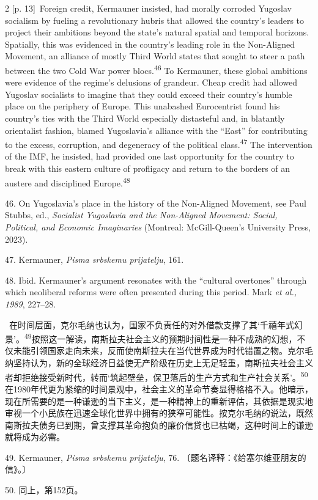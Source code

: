 \documentclass[10pt,a4paper]{article}
\begin{document}
\begin{paracol}{2}
{\scriptsize\color{gray} [p. 13]}\ Foreign credit, Kermauner insisted, had morally corroded Yugoslav socialism by fueling a revolutionary hubris that allowed the country’s leaders to project their ambitions beyond the state’s natural spatial and temporal horizons. Spatially, this was evidenced in the country’s leading role in the Non-Aligned Movement, an alliance of mostly Third World states that sought to steer a path between the two Cold War power blocs.\nobreak\textsuperscript{46} To Kermauner, these global ambitions were evidence of the regime’s delusions of grandeur. Cheap credit had allowed Yugoslav socialists to imagine that they could exceed their country’s humble place on the periphery of Europe. This unabashed Eurocentrist found his country’s ties with the Third World especially distasteful and, in blatantly orientalist fashion, blamed Yugoslavia’s alliance with the “East” for contributing to the excess, corruption, and degeneracy of the political class.\nobreak\textsuperscript{47} The intervention of the IMF, he insisted, had provided one last opportunity for the country to break with this eastern culture of profligacy and return to the borders of an austere and disciplined Europe.\nobreak\textsuperscript{48}\par{\small 46. On Yugoslavia’s place in the history of the Non-Aligned Movement, see Paul Stubbs, ed., \textit{Socialist Yugoslavia and the Non-Aligned Movement: Social, Political, and Economic Imaginaries} (Montreal: McGill-Queen’s University Press, 2023).\par}{\small 47. Kermauner, \textit{Pisma srbskemu prijatelju}, 161.\par}{\small 48. Ibid. Kermauner’s argument resonates with the “cultural overtones” through which neoliberal reforms were often presented during this period. Mark \textit{et al., 1989}, 227–28.\par}
\switchcolumn*
{\scriptsize\color{gray} [p. 13]}\ 在时间层面，克尔毛纳也认为，国家不负责任的对外借款支撑了其‘千禧年式幻景’。\nobreak\textsuperscript{49}按照这一解读，南斯拉夫社会主义的预期时间性是一种不成熟的幻想，不仅未能引领国家走向未来，反而使南斯拉夫在当代世界成为时代错置之物。克尔毛纳坚持认为，新的全球经济日益使无产阶级在历史上无足轻重，南斯拉夫社会主义者却拒绝接受新时代，转而‘筑起壁垒，保卫落后的生产方式和生产社会关系’。\nobreak\textsuperscript{50}在1980年代更为紧缩的时间景观中，社会主义的革命节奏显得格格不入。他暗示，现在所需要的是一种谦逊的当下主义，是一种精神上的重新评估，其依据是现实地审视一个小民族在迅速全球化世界中拥有的狭窄可能性。按克尔毛纳的说法，既然南斯拉夫债务已到期，曾支撑其革命抱负的廉价信贷也已枯竭，这种时间上的谦逊就将成为必需。\par{\small 49. Kermauner, \textit{Pisma srbskemu prijatelju}, 76. 〔题名译释：《给塞尔维亚朋友的信》。〕\par}{\small 50. 同上，第152页。\par}

\end{paracol}
\end{document}
